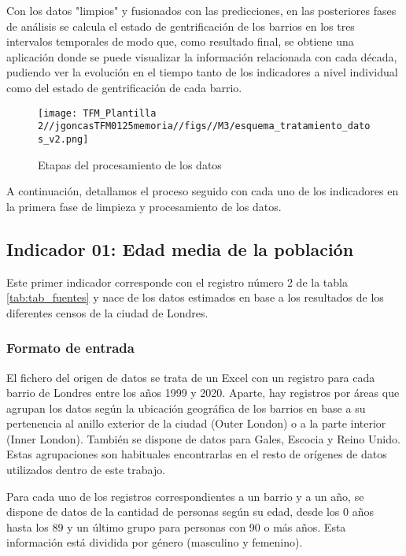 \documentclass[12pt,a4paper,twoside]{book}
\begin{document}
Con los datos "limpios" y fusionados con las predicciones, en las posteriores fases de análisis se calcula el estado de gentrificación de los barrios en los tres intervalos temporales de modo que, como resultado final, se obtiene una aplicación donde se puede visualizar la información relacionada con cada década, pudiendo ver la evolución en el tiempo tanto de los indicadores a nivel individual como del estado de gentrificación de cada barrio.

\begin{figure}
    \centering
    \texttt{[image: TFM\_Plantilla 2//jgoncasTFM0125memoria//figs//M3/esquema\_tratamiento\_datos\_v2.png]}
    \caption{Etapas del procesamiento de los datos}
    \label{fig:fig_procesamiento_datos}
\end{figure}

A continuación, detallamos el proceso seguido con cada uno de los indicadores en la primera fase de limpieza y procesamiento de los datos.

\subsection{Indicador 01: Edad media de la población}

Este primer indicador corresponde con el registro número 2 de la tabla \ref{tab:tab_fuentes} y nace de los datos estimados en base a los resultados de los diferentes censos de la ciudad de Londres.

\subsubsection{Formato de entrada}

El fichero del origen de datos se trata de un Excel con un registro para cada barrio de Londres entre los años 1999 y 2020. Aparte, hay registros por áreas que agrupan los datos según la ubicación geográfica de los barrios en base a su pertenencia al anillo exterior de la ciudad (Outer London) o a la parte interior (Inner London). También se dispone de datos para Gales, Escocia y Reino Unido. Estas agrupaciones son habituales encontrarlas en el resto de orígenes de datos utilizados dentro de este trabajo.

Para cada uno de los registros correspondientes a un barrio y a un año, se dispone de datos de la cantidad de personas según su edad, desde los 0 años hasta los 89 y un último grupo para personas con 90 o más años. Esta información está dividida por género (masculino y femenino). 
\end{document}
